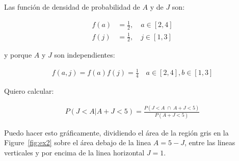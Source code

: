 \documentclass[10pt]{article}
\begin{document}
Las función de densidad de probabilidad de $A$ y de $J$ son:

\begin{align*}
    f(a)&=\frac{1}{2},\quad a\in[2,4]\\
    f(j)&=\frac{1}{2},\quad j\in[1,3]
\end{align*}

y porque $A$ y $J$ son independientes:

\begin{align*}
    f(a, j)=f(a)f(j)=\frac{1}{4}\quad a\in[2,4], b\in[1,3]
\end{align*}

Quiero calcular:

\begin{align}
    P(J<A|A+J<5)=\frac{P(J<A\;\cap\;A+J<5)}{P(A+J<5)}
	\label{eq:targetProbEx2}
\end{align}

Puedo hacer esto gráficamente, dividiendo el área de la región gris en la Figure~\ref{fig:ex2} sobre el área debajo de la linea $A=5-J$, entre las lineas verticales y por encima de la linea horizontal $J=1$.
\end{document}

